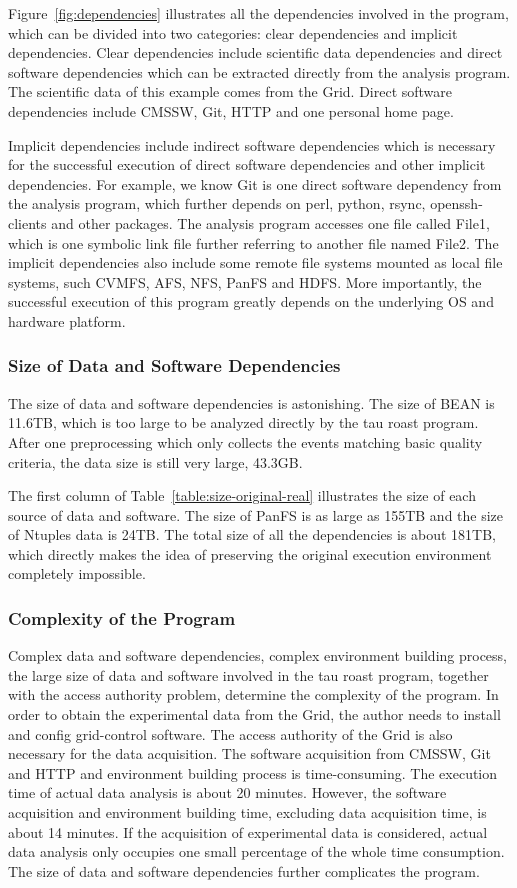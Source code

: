\documentclass{acm_proc_article-sp}
\begin{document}
Figure~\ref{fig:dependencies} illustrates all the dependencies
involved in the program, which can be divided into two categories: clear
dependencies and implicit dependencies. Clear dependencies include scientific data
dependencies and direct software dependencies which can be extracted directly
from the analysis program. The scientific data of this example comes from the Grid. Direct software dependencies include CMSSW, Git, HTTP and one personal home page. 

Implicit dependencies include indirect software
dependencies which is necessary for the successful execution of direct software
dependencies and other implicit dependencies. For example, we know Git is one
direct software dependency from the analysis program, which further depends on
perl, python, rsync, openssh-clients and other packages. The analysis program
accesses one file called File1, which is one symbolic link file further referring to
another file named File2.
The implicit dependencies also include some remote file systems mounted as local file systems, such CVMFS, AFS, NFS, PanFS and HDFS.
More importantly, the successful execution of this program greatly depends on the underlying OS and hardware platform.

\subsubsection{Size of Data and Software Dependencies}
The size of data and software dependencies is astonishing.
The size of BEAN is 11.6TB, which is too large to be analyzed directly by the tau roast program. After one preprocessing which only collects the events matching basic quality criteria, the data size is still very large, 43.3GB. 

The first column of Table~\ref{table:size-original-real} illustrates the size of each source of data and software. The size of PanFS is as large as 155TB and the size of Ntuples data is 24TB. The total size of all the dependencies is about 181TB, which directly makes the idea of preserving the original execution environment completely impossible.

\subsubsection{Complexity of the Program}
Complex data and software dependencies, complex environment building process, the large size of data and software involved in the tau roast program, together with the access authority problem, determine the complexity of the program. 
In order to obtain the experimental data from the Grid, the author needs to install and config grid-control software. 
The access authority of the Grid is also necessary for the data acquisition.
The software acquisition from CMSSW, Git and HTTP and environment building process is time-consuming. The execution time of actual data analysis is about 20 minutes. However, the software acquisition and environment building time, excluding data acquisition time, is about 14 minutes. If the acquisition of experimental data is considered, actual data analysis only occupies one small percentage of the whole time consumption.
The size of data and software dependencies further complicates the program.
\end{document}

